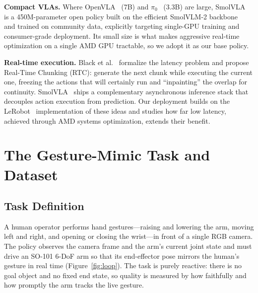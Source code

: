 \documentclass[blind]{gtac}
\begin{document}
\textbf{Compact VLAs.}
Where OpenVLA~\cite{openvla} (7B) and $\pi_0$~\cite{pi0} (3.3B) are large,
SmolVLA~\cite{smolvla} is a 450M-parameter open policy built on the efficient
SmolVLM-2 backbone~\cite{smolvlm} and trained on community
data, explicitly targeting single-GPU training and consumer-grade deployment.
Its small size is what makes aggressive real-time optimization on a single AMD
GPU tractable, so we adopt it as our base policy.

\textbf{Real-time execution.}
Black et al.~\cite{rtc} formalize the latency problem and propose Real-Time
Chunking (RTC): generate the next chunk while executing the current one, freezing
the actions that will certainly run and ``inpainting'' the overlap for
continuity. SmolVLA~\cite{smolvla} ships a complementary asynchronous inference
stack that decouples action execution from prediction. Our deployment builds on
the LeRobot~\cite{lerobot} implementation of these ideas and studies how far
low latency, achieved through AMD systems optimization, extends their benefit.

\section{The Gesture-Mimic Task and Dataset}
\label{sec:task}

\subsection{Task Definition}

A human operator performs hand gestures---raising and lowering the arm, moving
left and right, and opening or closing the wrist---in front of a single RGB
camera. The policy observes the camera frame and the arm's current joint state
and must drive an SO-101 6-DoF arm so that its end-effector pose mirrors the
human's gesture in real time (Figure~\ref{fig:loop}). The task is purely
reactive: there is no goal object and no fixed end state, so quality is measured
by how faithfully and how promptly the arm tracks the live gesture.
\end{document}
